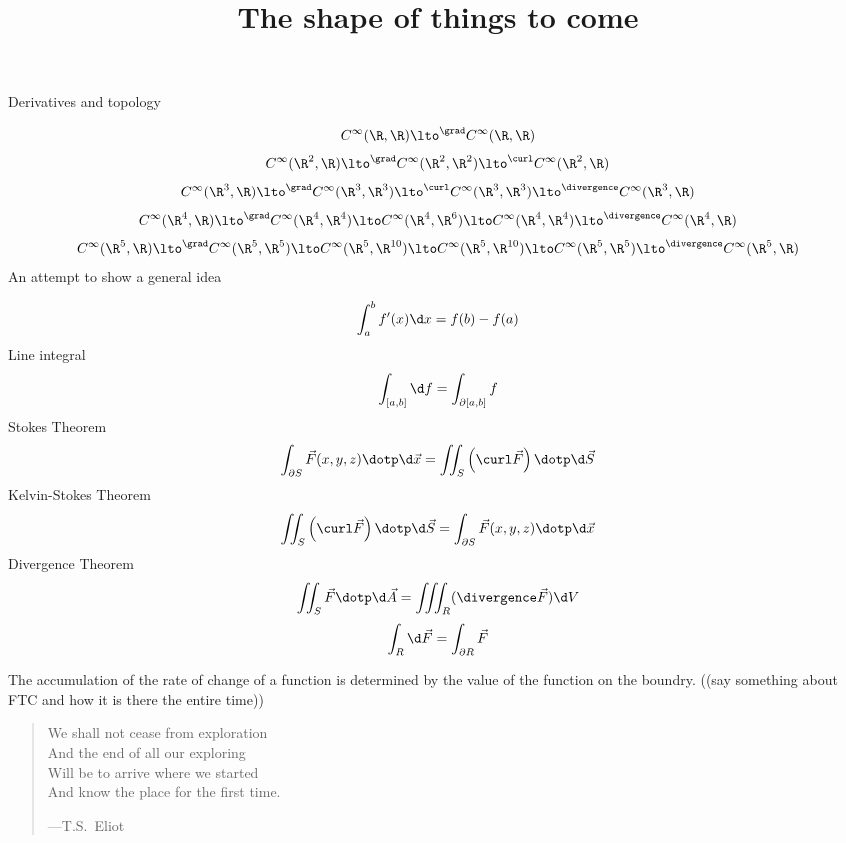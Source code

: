\documentclass{ximera}
\title[Dig-In:]{The shape of things to come}
\begin{document}
\begin{abstract}
\end{abstract}
\maketitle


Derivatives and topology

\[
C^\infty(\R,\R)\lto^{\grad} C^\infty(\R,\R)
\]
\[
C^\infty(\R^2,\R) \lto^{\grad} C^\infty(\R^2,\R^2) \lto^{\curl} C^\infty(\R^2,\R)
\]
\[
C^\infty(\R^3,\R) \lto^{\grad} C^\infty(\R^3,\R^3) \lto^{\curl}C^\infty(\R^3,\R^3) \lto^{\divergence} C^\infty(\R^3,\R)
\]
\[
C^\infty(\R^4,\R) \lto^{\grad} C^\infty(\R^4,\R^4) \lto C^\infty(\R^4,\R^6) \lto C^\infty(\R^4,\R^4) \lto^{\divergence} C^\infty(\R^4,\R)
\]
\[
C^\infty(\R^5,\R) \lto^{\grad} C^\infty(\R^5,\R^5) \lto C^\infty(\R^5,\R^{10}) \lto C^\infty(\R^5,\R^{10}) \lto C^\infty (\R^5,\R^5)\lto^{\divergence} C^\infty(\R^5,\R)
\]
An attempt to show a general idea

\[
\int_a^b f'(x) \d x = f(b) - f(a)
\]
Line integral
\[
\int_{[a,b]} \d f = \int_{\partial[a,b]} f
\]
Stokes Theorem
\[
\int_{\partial S} \vec{F}(x,y,z)\dotp \d \vec{x} = \iint_S \left(\curl\vec{F}\right)\dotp \d \vec{S}
\]
Kelvin-Stokes Theorem
\[
\iint_S \left(\curl\vec{F}\right)\dotp \d \vec{S} = \int_{\partial S} \vec{F}(x,y,z)\dotp \d \vec{x}
\]
Divergence Theorem
\[
\iint_S \vec{F}\dotp \d \vec{A} = \iiint_R (\divergence \vec{F}) \d V
\]
\[
\int_R \d \vec{F} = \int_{\partial R} \vec{F}
\]

The accumulation of the rate of change of a function is determined by
the value of the function on the boundry. ((say something about FTC and how it is there the entire time))

\begin{quote}
  We shall not cease from exploration\\
  And the end of all our exploring \\
  Will be to arrive where we started \\
  And know the place for the first time.

  \hfill ---T.S.\ Eliot
\end{quote}
\end{document}

